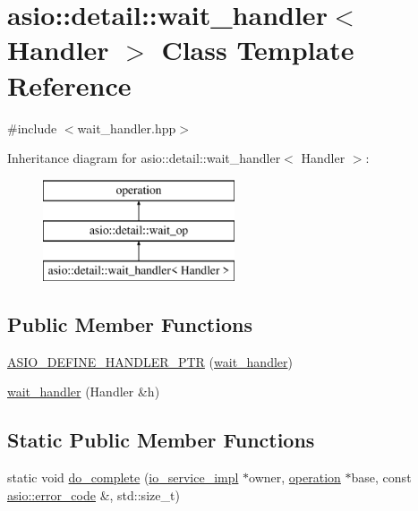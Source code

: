 \hypertarget{classasio_1_1detail_1_1wait__handler}{}\section{asio\+:\+:detail\+:\+:wait\+\_\+handler$<$ Handler $>$ Class Template Reference}
\label{classasio_1_1detail_1_1wait__handler}


{\ttfamily \#include $<$wait\+\_\+handler.\+hpp$>$}

Inheritance diagram for asio\+:\+:detail\+:\+:wait\+\_\+handler$<$ Handler $>$\+:\begin{figure}[H]
\begin{center}
\leavevmode
\includegraphics[height=3.000000cm]{classasio_1_1detail_1_1wait__handler}
\end{center}
\end{figure}
\subsection*{Public Member Functions}
\begin{DoxyCompactItemize}
\item 
\hyperlink{classasio_1_1detail_1_1wait__handler_a1fd5acc7d8b075868962e555b8041f71}{A\+S\+I\+O\+\_\+\+D\+E\+F\+I\+N\+E\+\_\+\+H\+A\+N\+D\+L\+E\+R\+\_\+\+P\+T\+R} (\hyperlink{classasio_1_1detail_1_1wait__handler}{wait\+\_\+handler})
\item 
\hyperlink{classasio_1_1detail_1_1wait__handler_aa3902f9842fbda5570e78414f7ca0b11}{wait\+\_\+handler} (Handler \&h)
\end{DoxyCompactItemize}
\subsection*{Static Public Member Functions}
\begin{DoxyCompactItemize}
\item 
static void \hyperlink{classasio_1_1detail_1_1wait__handler_a6be414f7efcf4ed67940d1740678c4d8}{do\+\_\+complete} (\hyperlink{namespaceasio_1_1detail_a6d61d9b8e53c11288be549d82aec5a42}{io\+\_\+service\+\_\+impl} $\ast$owner, \hyperlink{namespaceasio_1_1detail_a338968609bec20e37145309f8f9ec936}{operation} $\ast$base, const \hyperlink{classasio_1_1error__code}{asio\+::error\+\_\+code} \&, std\+::size\+\_\+t)
\end{DoxyCompactItemize}
